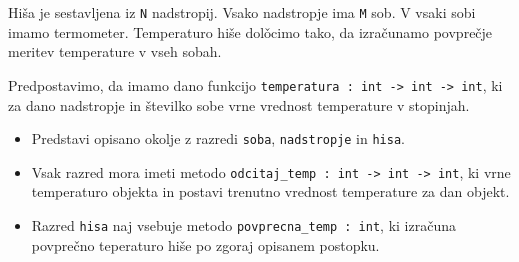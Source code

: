 %
%
%



\begin{ex}
Hi\v sa je sestavljena iz \texttt{N} nadstropij. Vsako nadstropje ima \texttt{M} sob. V vsaki sobi imamo termometer. Temperaturo hi\v se dolo\v\/cimo tako, da izra\v cunamo povpre\v cje meritev temperature v vseh sobah. 

Predpostavimo, da imamo dano funkcijo \lstinline{temperatura : int -> int -> int}, ki za dano nadstropje in \v stevilko sobe vrne vrednost temperature v stopinjah. 

\begin{itemize}
\item Predstavi opisano okolje z razredi \lstinline{soba}, \lstinline{nadstropje} in \lstinline{hisa}.

\item Vsak razred mora imeti metodo \lstinline{odcitaj_temp : int -> int -> int}, ki vrne temperaturo objekta in  postavi trenutno vrednost temperature za dan objekt.

\item Razred \lstinline{hisa} naj vsebuje metodo \lstinline{povprecna_temp : int}, ki izra\v cuna povpre\v cno teperaturo hi\v se po zgoraj opisanem postopku.
\end{itemize}
\end{ex} 









